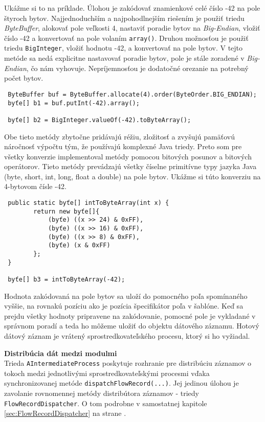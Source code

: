 Ukážme si to na príklade. Úlohou je zakódovať znamienkové celé číslo -42 na pole štyroch bytov.
Najjednoduchším a najpohodlnejším riešením je použiť triedu \emph{ByteBuffer}, alokovať pole veľkosti 
4, nastaviť poradie bytov na \emph{Big-Endian}, vložiť číslo -42 a konvertovať na pole 
volaním \verb|array()|. Druhou možnosťou je použiť triedu \verb|BigInteger|, vložiť hodnotu -42, 
a konvertovať na pole bytov. V tejto metóde sa nedá explicitne nastavovať poradie bytov, pole 
je stále zoradené v \emph{Big-Endian}, čo nám vyhovuje. Nepríjemnosťou je dodatočné orezanie na 
potrebný počet bytov. 
\begin{verbatim}
 ByteBuffer buf = ByteBuffer.allocate(4).order(ByteOrder.BIG_ENDIAN);
 byťe[] b1 = buf.putInt(-42).array();
 
 byťe[] b2 = BigInteger.valueOf(-42).toByteArray();
\end{verbatim}
Obe tieto metódy zbytočne pridávajú réžiu, zložitosť a zvyšujú pamäťovú náročnosť výpočtu tým, že 
používajú komplexné Java triedy. Preto som pre všetky konverzie implementoval metódy pomocou bitových
posunov a bitových operátorov. Tieto metódy prevádzajú všetky číselne primitívne typy jazyka Java 
(byte, short, int, long, float a double) na pole bytov. Ukážme si túto konverziu na 4-bytovom 
čísle -42.
\begin{verbatim}
 public static byťe[] intToByteArray(int x) {
        return new byťe[]{
            (byťe) ((x >> 24) & 0xFF),
            (byťe) ((x >> 16) & 0xFF),
            (byťe) ((x >> 8) & 0xFF),
            (byťe) (x & 0xFF)
        };
 }
 
 byťe[] b3 = intToByteArray(-42);
\end{verbatim}

Hodnota zakódovaná na pole bytov sa uloží do pomocného poľa spomínaného vyššie, na rovnakú pozíciu
ako je pozícia špecifikátor poľa v šablóne. Keď sa prejdu všetky hodnoty pripravene na zakódovanie, 
pomocné pole je vykladané v správnom poradí a teda ho môžeme uložiť do objektu dátového záznamu.
Hotový dátový záznam je vrátený sprostredkovateľského procesu, ktorý si ho vyžiadal.


\textbf{Distribúcia dát medzi modulmi} \\
Trieda \verb|AIntermediateProcess| poskytuje rozhranie pre distribúciu záznamov o tokoch medzi 
jednotlivými sprostredkovateľskými procesmi vďaka synchronizovanej metóde \verb|dispatchFlowRecord(...)|. 
Jej jedinou úlohou je zavolanie rovnomennej metódy distribútora záznamov - triedy \verb|FlowRecordDispatcher|.
O tom podrobne v samostatnej kapitole \ref{sec:FlowRecordDispatcher} na strane 
\pageref{sec:FlowRecordDispatcher}.



